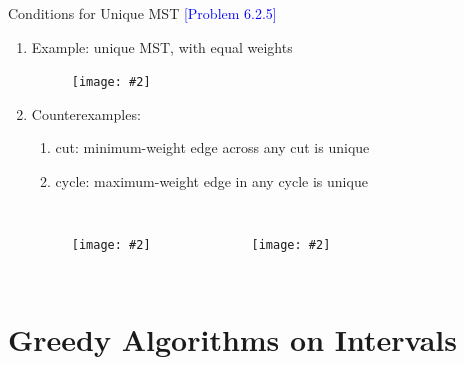 \documentclass{beamer}
\newcommand{\xmark}{\textcolor{red}{\ding{55}}}
\newcommand{\problemno}[1]{\textcolor{blue}{\scriptsize [Problem #1]}}
\newcommand{\fignocaption}[2]
{
  \begin{figure}[htp]
    \centering
      \texttt{[image: \#2]}
  \end{figure}
}
\begin{document}
\begin{frame}{}
  \begin{block}{Conditions for Unique MST \problemno{6.2.5}}
    \begin{enumerate}
      \item Example: unique MST, with equal weights
        \fignocaption{width = 0.20\textwidth}{fig/unique-mst-partition.pdf}
      \item Counterexamples:
        \begin{enumerate}
          \item \xmark cut: minimum-weight edge across any cut is unique
          \item \xmark cycle: maximum-weight edge in any cycle is unique
        \end{enumerate}
        \begin{columns}
            \fignocaption{width = 0.40\textwidth}{fig/unique-mst-partition.pdf}
            \fignocaption{width = 0.45\textwidth}{fig/unique-mst-cycle.pdf}
        \end{columns}
    \end{enumerate}
  \end{block}
\end{frame}
\section{Greedy Algorithms on Intervals}
\end{document}
